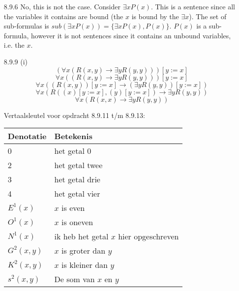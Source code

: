 \begin{enumerate}
  \item[8.9.6]
    No, this is not the case.
    Consider $\exists x P(x)$.
    This is a sentence since all the variables it contains are bound (the $x$ is bound by the $\exists x$).
    The set of sub-formulas is
    $sub(\exists x P(x)) = \{\exists x P(x), P(x)\}$.
    $P(x)$ is a sub-formula, however it is not sentences since it contains an unbound variables, i.e. the $x$.\\


  \item[8.9.9 (i)]
    $$(\forall x(R(x,y) \rightarrow \exists y R(y,y)))[y := x]$$
    $$\forall x((R(x,y) \rightarrow \exists y R(y,y)))[y := x]$$
    $$\forall x((R(x,y))[y := x] \rightarrow (\exists y R(y,y))[y := x])$$
    $$\forall x(R((x)[y := x],(y)[y := x]) \rightarrow \exists y R(y,y))$$
    $$\forall x(R(x,x) \rightarrow \exists y R(y,y))$$

    Vertaalsleutel voor opdracht 8.9.11 t/m 8.9.13: \\
    \begin{tabular}{l|l}
      Denotatie & Betekenis\\
      \hline
      0 & het getal 0 \\
      2 & het getal twee \\
      3 & het getal drie \\
      4 & het getal vier \\
      $E^1(x)$ & $x$ is even \\
      $O^1(x)$ & $x$ is oneven \\
      $N^1(x)$ & ik heb het getal $x$ hier opgeschreven \\
      $G^2(x,y)$ & $x$ is groter dan $y$\\
      $K^2(x,y)$ & $x$ is kleiner dan $y$\\
      $s^2(x,y)$ & De som van $x$ en $y$\\
    \end{tabular}


\end{enumerate}
